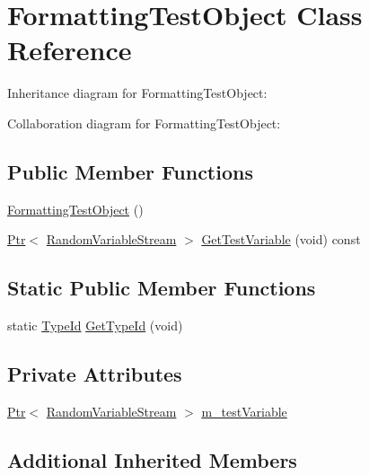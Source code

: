 \hypertarget{classFormattingTestObject}{}\section{Formatting\+Test\+Object Class Reference}
\label{classFormattingTestObject}


Inheritance diagram for Formatting\+Test\+Object\+:


Collaboration diagram for Formatting\+Test\+Object\+:
\subsection*{Public Member Functions}
\begin{DoxyCompactItemize}
\item 
\hyperlink{classFormattingTestObject_aca251f3286646a430663783061f7e5f6}{Formatting\+Test\+Object} ()
\item 
\hyperlink{classns3_1_1Ptr}{Ptr}$<$ \hyperlink{classns3_1_1RandomVariableStream}{Random\+Variable\+Stream} $>$ \hyperlink{classFormattingTestObject_a28e10307ede8d8c9b118ab0d3b83739b}{Get\+Test\+Variable} (void) const 
\end{DoxyCompactItemize}
\subsection*{Static Public Member Functions}
\begin{DoxyCompactItemize}
\item 
static \hyperlink{classns3_1_1TypeId}{Type\+Id} \hyperlink{classFormattingTestObject_a8d01d15af307907b4bd8e54ee8549526}{Get\+Type\+Id} (void)
\end{DoxyCompactItemize}
\subsection*{Private Attributes}
\begin{DoxyCompactItemize}
\item 
\hyperlink{classns3_1_1Ptr}{Ptr}$<$ \hyperlink{classns3_1_1RandomVariableStream}{Random\+Variable\+Stream} $>$ \hyperlink{classFormattingTestObject_a54584305ef7459968edc8a09c1a5fc33}{m\+\_\+test\+Variable}
\end{DoxyCompactItemize}
\subsection*{Additional Inherited Members}


